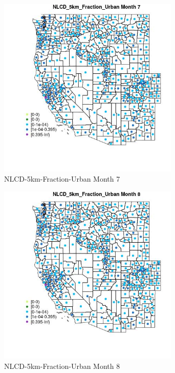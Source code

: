\begin{figure} 
\centering  
\includegraphics[width=0.77\textwidth]{Code_Outputs/df_report_ML_predictors_CountyCentroid_Locations_Dates_2008-01-01to2018-12-31_MapObsMo7NLCD_5km_Fraction_Urban.jpg} 
\caption{\label{fig:df_report_ML_predictors_CountyCentroid_Locations_Dates_2008-01-01to2018-12-31MapObsMo7NLCD_5km_Fraction_Urban}NLCD-5km-Fraction-Urban Month 7} 
\end{figure} 
 

\begin{figure} 
\centering  
\includegraphics[width=0.77\textwidth]{Code_Outputs/df_report_ML_predictors_CountyCentroid_Locations_Dates_2008-01-01to2018-12-31_MapObsMo8NLCD_5km_Fraction_Urban.jpg} 
\caption{\label{fig:df_report_ML_predictors_CountyCentroid_Locations_Dates_2008-01-01to2018-12-31MapObsMo8NLCD_5km_Fraction_Urban}NLCD-5km-Fraction-Urban Month 8} 
\end{figure} 
 


